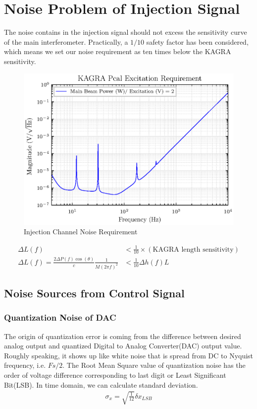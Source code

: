 \clearpage
\section{Noise Problem of Injection Signal}

The noise contains in the injection signal should not excess the sensitivity curve of the main interferometer. Practically, a $1/10$ safety factor has been considered, which means we set our noise requirement as ten times below the KAGRA sensitivity.  


\begin{figure}[hbt!]
\centering
\includegraphics[width=.9\textwidth]{figure/DAC_requirement.eps}
\caption{Injection Channel Noise Requirement}\label{fig:DAC_noise_requirement}
\end{figure}

\begin{align}
   \Delta L(f) &< \frac{1}{10} \times (\text{KAGRA length sensitivity})\\
   \Delta L(f) =\frac{2 \Delta P(f) \cos(\theta)}{c} \frac{1}{M(2 \pi f)^2} &< \frac{1}{10} \Delta h(f) L
\end{align}




\subsection{Noise Sources from Control Signal}
\subsubsection{Quantization Noise of DAC}


The origin of quantization error is coming from the difference between desired analog output and quantized Digital to Analog Converter(DAC) output value. Roughly speaking, it shows up like white noise that is spread from DC to Nyquist frequency, i.e. $Fs/2$.
The Root Mean Square value of quantization noise has the order of voltage difference corresponding to last digit or Least Significant Bit(LSB). In time domain, we can calculate standard deviation.
\begin{align}
   \sigma_x = \sqrt{\frac{1}{12}} \delta x_{LSB}
\end{align}

